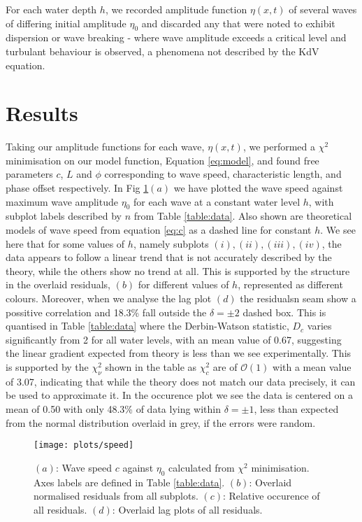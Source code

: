 \documentclass[10pt, twocolumn]{revtex4}    %
\begin{document}
For each water depth $h$, we recorded amplitude function $\eta(x, t)$ of several waves of differing initial amplitude $\eta_0$ and discarded any that were noted to exhibit dispersion or wave breaking - where wave amplitude exceeds a critical level and turbulant behaviour is observed, a phenomena not described by the KdV equation.

\section{Results}
Taking our amplitude functions for each wave, $\eta(x, t)$, we performed a $\chi^2$ minimisation on our model function,  Equation \ref{eq:model}, and found free parameters $c$, $L$ and $\phi$ corresponding to wave speed, characteristic length, and phase offset respectively.
In Fig \ref{plot:c}$(a)$ we have plotted the wave speed against maximum wave amplitude $\eta_0$ for each wave at a constant water level $h$, with subplot labels described by $n$ from Table \ref{table:data}.
Also shown are theoretical models of wave speed from equation \ref{eq:c} as a dashed line for constant $h$.
We see here that for some values of $h$, namely subplots $(i), (ii), (iii), (iv)$, the data appears to follow a linear trend that is not accurately described by the theory, while the others show no trend at all.
This is supported by the structure in the overlaid residuals, $(b)$ for different values of $h$, represented as different colours.
Moreover, when we analyse the lag plot $(d)$ the residualsn seam show a possitive correlation and 18.3\% fall outside the $\delta=\pm 2$ dashed box.
This is quantised in Table \ref{table:data} where the Derbin-Watson statistic, $D_c$ varies significantly from 2 for all water levels, with an mean value of 0.67, suggesting the linear gradient expected from theory is less than we see experimentally.
This is supported by the $\chi^2_\nu$ shown in the table as $\chi^2_c$ are of $\mathcal{O}(1)$ with a mean value of 3.07, indicating that while the theory does not match our data precisely, it can be used to approximate it.
In the occurence plot we see the data is centered on a mean of 0.50 with only 48.3\% of data lying within $\delta=\pm 1$, less than expected from the normal distribution overlaid in grey, if the errors were random.

\begin{figure}[!h]
  \texttt{[image: plots/speed]}
  \caption{
  $(a)$: Wave speed $c$ against $\eta_0$ calculated from $\chi^2$ minimisation. Axes labels are defined in Table \ref{table:data}.
  $(b)$: Overlaid normalised residuals from all subplots.
  $(c)$: Relative occurence of all residuals.
  $(d)$: Overlaid lag plots of all residuals.
  }
  \label{plot:c}
\end{figure}
\end{document}
